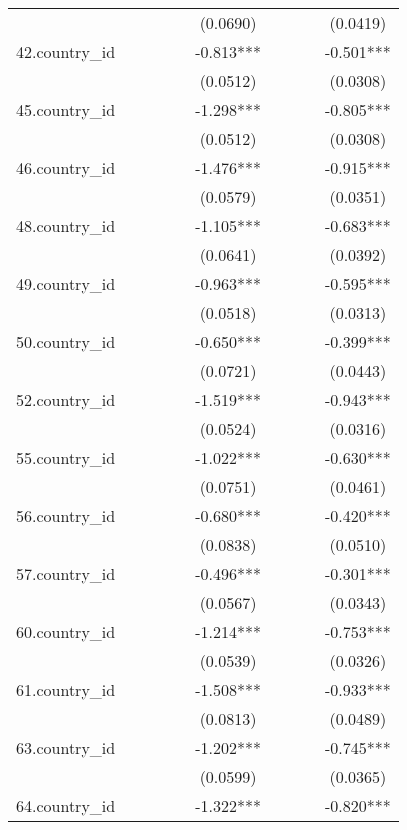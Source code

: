 \documentclass[]{article}
\begin{document}
\begin{tabular}{lccccccccc}
 &  &  &  &  & (0.0690) &  &  &  & (0.0419) \\
42.country\_id &  &  &  &  & -0.813*** &  &  &  & -0.501*** \\
 &  &  &  &  & (0.0512) &  &  &  & (0.0308) \\
45.country\_id &  &  &  &  & -1.298*** &  &  &  & -0.805*** \\
 &  &  &  &  & (0.0512) &  &  &  & (0.0308) \\
46.country\_id &  &  &  &  & -1.476*** &  &  &  & -0.915*** \\
 &  &  &  &  & (0.0579) &  &  &  & (0.0351) \\
48.country\_id &  &  &  &  & -1.105*** &  &  &  & -0.683*** \\
 &  &  &  &  & (0.0641) &  &  &  & (0.0392) \\
49.country\_id &  &  &  &  & -0.963*** &  &  &  & -0.595*** \\
 &  &  &  &  & (0.0518) &  &  &  & (0.0313) \\
50.country\_id &  &  &  &  & -0.650*** &  &  &  & -0.399*** \\
 &  &  &  &  & (0.0721) &  &  &  & (0.0443) \\
52.country\_id &  &  &  &  & -1.519*** &  &  &  & -0.943*** \\
 &  &  &  &  & (0.0524) &  &  &  & (0.0316) \\
55.country\_id &  &  &  &  & -1.022*** &  &  &  & -0.630*** \\
 &  &  &  &  & (0.0751) &  &  &  & (0.0461) \\
56.country\_id &  &  &  &  & -0.680*** &  &  &  & -0.420*** \\
 &  &  &  &  & (0.0838) &  &  &  & (0.0510) \\
57.country\_id &  &  &  &  & -0.496*** &  &  &  & -0.301*** \\
 &  &  &  &  & (0.0567) &  &  &  & (0.0343) \\
60.country\_id &  &  &  &  & -1.214*** &  &  &  & -0.753*** \\
 &  &  &  &  & (0.0539) &  &  &  & (0.0326) \\
61.country\_id &  &  &  &  & -1.508*** &  &  &  & -0.933*** \\
 &  &  &  &  & (0.0813) &  &  &  & (0.0489) \\
63.country\_id &  &  &  &  & -1.202*** &  &  &  & -0.745*** \\
 &  &  &  &  & (0.0599) &  &  &  & (0.0365) \\
64.country\_id &  &  &  &  & -1.322*** &  &  &  & -0.820*** \\

\end{tabular}
\end{document}
